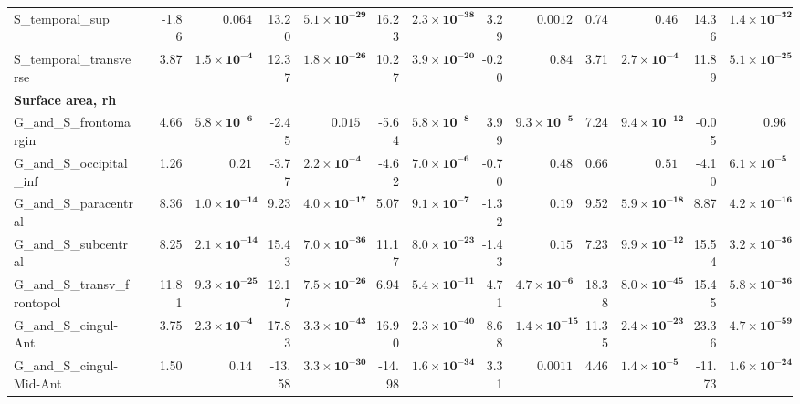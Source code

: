 {\begin{longtable}{llrrrrrrrrrrrr}
S\_temporal\_sup &  & -1.86 & $0.064$ & 13.20 & $\mathbf{5.1{\times}10^{-29}}$ & 16.23 & $\mathbf{2.3{\times}10^{-38}}$ & 3.29 & $0.0012$ & 0.74 & $0.46$ & 14.36 & $\mathbf{1.4{\times}10^{-32}}$ \\
S\_temporal\_transverse &  & 3.87 & $\mathbf{1.5{\times}10^{-4}}$ & 12.37 & $\mathbf{1.8{\times}10^{-26}}$ & 10.27 & $\mathbf{3.9{\times}10^{-20}}$ & -0.20 & $0.84$ & 3.71 & $\mathbf{2.7{\times}10^{-4}}$ & 11.89 & $\mathbf{5.1{\times}10^{-25}}$ \\
\midrule\multicolumn{14}{l}{\textbf{Surface area, rh}} \\
G\_and\_S\_frontomargin &  & 4.66 & $\mathbf{5.8{\times}10^{-6}}$ & -2.45 & $0.015$ & -5.64 & $\mathbf{5.8{\times}10^{-8}}$ & 3.99 & $\mathbf{9.3{\times}10^{-5}}$ & 7.24 & $\mathbf{9.4{\times}10^{-12}}$ & -0.05 & $0.96$ \\
G\_and\_S\_occipital\_inf &  & 1.26 & $0.21$ & -3.77 & $\mathbf{2.2{\times}10^{-4}}$ & -4.62 & $\mathbf{7.0{\times}10^{-6}}$ & -0.70 & $0.48$ & 0.66 & $0.51$ & -4.10 & $\mathbf{6.1{\times}10^{-5}}$ \\
G\_and\_S\_paracentral &  & 8.36 & $\mathbf{1.0{\times}10^{-14}}$ & 9.23 & $\mathbf{4.0{\times}10^{-17}}$ & 5.07 & $\mathbf{9.1{\times}10^{-7}}$ & -1.32 & $0.19$ & 9.52 & $\mathbf{5.9{\times}10^{-18}}$ & 8.87 & $\mathbf{4.2{\times}10^{-16}}$ \\
G\_and\_S\_subcentral &  & 8.25 & $\mathbf{2.1{\times}10^{-14}}$ & 15.43 & $\mathbf{7.0{\times}10^{-36}}$ & 11.17 & $\mathbf{8.0{\times}10^{-23}}$ & -1.43 & $0.15$ & 7.23 & $\mathbf{9.9{\times}10^{-12}}$ & 15.54 & $\mathbf{3.2{\times}10^{-36}}$ \\
G\_and\_S\_transv\_frontopol &  & 11.81 & $\mathbf{9.3{\times}10^{-25}}$ & 12.17 & $\mathbf{7.5{\times}10^{-26}}$ & 6.94 & $\mathbf{5.4{\times}10^{-11}}$ & 4.71 & $\mathbf{4.7{\times}10^{-6}}$ & 18.38 & $\mathbf{8.0{\times}10^{-45}}$ & 15.45 & $\mathbf{5.8{\times}10^{-36}}$ \\
G\_and\_S\_cingul-Ant &  & 3.75 & $\mathbf{2.3{\times}10^{-4}}$ & 17.83 & $\mathbf{3.3{\times}10^{-43}}$ & 16.90 & $\mathbf{2.3{\times}10^{-40}}$ & 8.68 & $\mathbf{1.4{\times}10^{-15}}$ & 11.35 & $\mathbf{2.4{\times}10^{-23}}$ & 23.36 & $\mathbf{4.7{\times}10^{-59}}$ \\
G\_and\_S\_cingul-Mid-Ant &  & 1.50 & $0.14$ & -13.58 & $\mathbf{3.3{\times}10^{-30}}$ & -14.98 & $\mathbf{1.6{\times}10^{-34}}$ & 3.31 & $0.0011$ & 4.46 & $\mathbf{1.4{\times}10^{-5}}$ & -11.73 & $\mathbf{1.6{\times}10^{-24}}$ \\

\end{longtable}}
